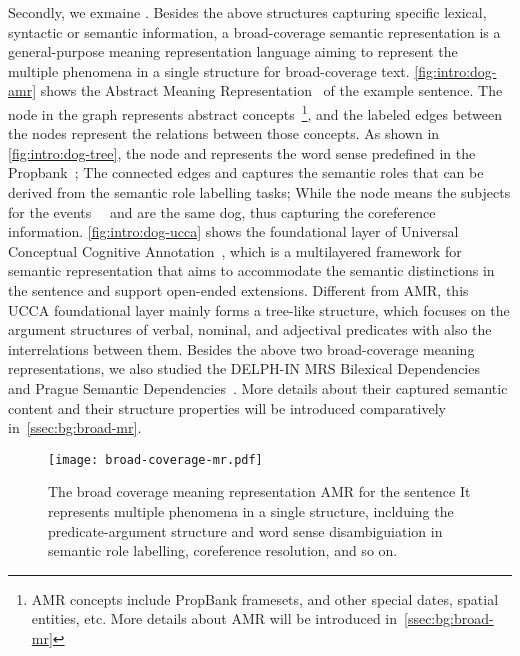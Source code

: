 Secondly, we exmaine . Besides the above structures capturing specific
lexical, syntactic or semantic information, a broad-coverage semantic
representation is a general-purpose meaning representation language
aiming to represent the multiple phenomena in a single structure for
broad-coverage text. \autoref{fig:intro:dog-amr} shows the Abstract
Meaning Representation~\citep[,][]{Ban:Bon:Cai:13} of the
example sentence. The node in the graph represents abstract
concepts~\footnote{AMR concepts include PropBank framesets, and other
  special dates, spatial entities, etc. More details about AMR will be
  introduced in~\autoref{ssec:bg:broad-mr}}, and the labeled edges
between the nodes represent the relations between those concepts. As
shown in \autoref{fig:intro:dog-tree}, the node  and
 represents the word sense predefined in the
Propbank~\cite{Kin:Pal:02}; The connected edges  and
 captures the semantic roles that can be derived from
the semantic role labelling tasks; While the node 
means the subjects for the events ~~and
 are the same dog, thus capturing the coreference
information. \autoref{fig:intro:dog-ucca} shows the foundational layer
of Universal Conceptual Cognitive
Annotation~\citep[,][]{Abe:Rap:13b}, which is a multilayered
framework for semantic representation that aims to accommodate the
semantic distinctions in the sentence and support open-ended
extensions. Different from AMR, this UCCA foundational layer mainly
forms a tree-like structure, which focuses on the argument structures
of verbal, nominal, and adjectival predicates with also the
interrelations between them. Besides the above two broad-coverage
meaning representations, we also studied the DELPH-IN MRS Bilexical
Dependencies~\citep[,][]{ivanova2012did} and Prague Semantic
Dependencies~\citep[,][]{hajic2012announcing,miyao2014house}. More
details about their captured semantic content and their structure
properties will be introduced comparatively
in~\autoref{ssec:bg:broad-mr}.

\begin{figure}[!tbp]
\centering
\texttt{[image: broad-coverage-mr.pdf]}
\caption{\label{fig:intro:dog-amr} The broad coverage meaning
  representation AMR for the sentence \emph{} It represents multiple
  phenomena in a single structure, inclduing the predicate-argument
  structure and word sense disambiguiation in semantic role labelling,
  coreference resolution, and so on.}
\end{figure}


